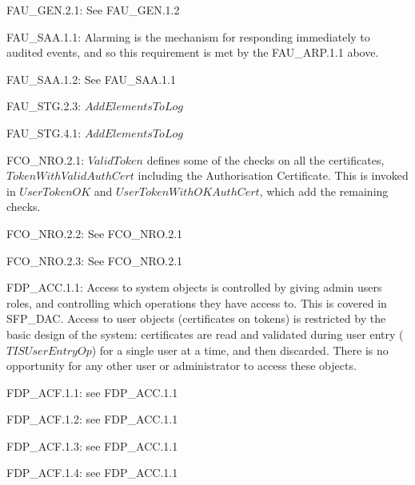 {\footnotesize \sf 
FAU\_GEN.2.1:
}
\newline
	See FAU\_GEN.1.2

{\footnotesize \sf 
FAU\_SAA.1.1:
}
\newline
	Alarming is the mechanism for responding immediately to
	audited events, and so this requirement is met by the
	FAU\_ARP.1.1 above. 

{\footnotesize \sf 
FAU\_SAA.1.2:
}
\newline
	See FAU\_SAA.1.1

{\footnotesize \sf 
FAU\_STG.2.3:
}
\newline
	$AddElementsToLog$

{\footnotesize \sf 
FAU\_STG.4.1:
}
\newline
	$AddElementsToLog$

{\footnotesize \sf 
FCO\_NRO.2.1:
}
\newline
	$ValidToken$ defines some of the checks on all the
	certificates, $TokenWithValidAuthCert$ including the
	Authorisation Certificate. This is invoked in $UserTokenOK$
	and $UserTokenWithOKAuthCert$, which add the remaining
	checks. 

{\footnotesize \sf 
FCO\_NRO.2.2:
}
\newline
	See FCO\_NRO.2.1

{\footnotesize \sf 
FCO\_NRO.2.3:
}
\newline
	See FCO\_NRO.2.1

{\footnotesize \sf 
FDP\_ACC.1.1:
}
\newline
	Access to system objects is controlled by giving admin users
	roles, and controlling which operations they have access
	to. This is covered in SFP\_DAC. Access to user objects
	(certificates on tokens) is restricted by the basic design of
	the system: certificates are read and validated during user
	entry ($TISUserEntryOp$) for a single user at a time, and then
	discarded. There is no opportunity for any other user or
	administrator to access these objects. 

{\footnotesize \sf 
FDP\_ACF.1.1:
}
\newline
	see FDP\_ACC.1.1

{\footnotesize \sf 
FDP\_ACF.1.2:
}
\newline
	see FDP\_ACC.1.1

{\footnotesize \sf 
FDP\_ACF.1.3:
}
\newline
	see FDP\_ACC.1.1

{\footnotesize \sf 
FDP\_ACF.1.4:
}
\newline
	see FDP\_ACC.1.1
	
